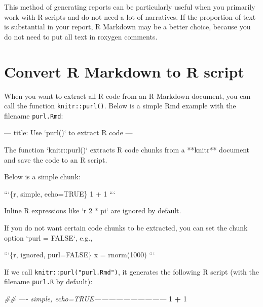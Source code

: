 \documentclass[
  11pt,
]{krantz}
\newenvironment{Shaded}{\begin{snugshade}}{\end{snugshade}}
\newcommand{\BaseNTok}[1]{\textcolor[rgb]{0.06,0.06,0.06}{#1}}
\newcommand{\CommentTok}[1]{\textcolor[rgb]{0.37,0.37,0.37}{\textit{#1}}}
\newcommand{\DecValTok}[1]{\textcolor[rgb]{0.06,0.06,0.06}{#1}}
\newcommand{\NormalTok}[1]{#1}
\newcommand{\OperatorTok}[1]{\textcolor[rgb]{0.43,0.43,0.43}{\textbf{#1}}}
\newcommand{\StringTok}[1]{\textcolor[rgb]{0.5,0.5,0.5}{#1}}
\begin{document}
This method of generating reports can be particularly useful when you primarily work with R scripts and do not need a lot of narratives. If the proportion of text is substantial in your report, R Markdown may be a better choice, because you do not need to put all text in roxygen comments.

\hypertarget{purl}{%
\section{Convert R Markdown to R script}\label{purl}}

When you want to extract all R code from an R Markdown document, you can call the function \texttt{knitr::purl()}. Below is a simple Rmd example with the filename \texttt{purl.Rmd}:

\begin{Shaded}
\begin{Highlighting}[]
\NormalTok{---}
\NormalTok{title: Use }\BaseNTok{`purl()`}\NormalTok{ to extract R code}
\NormalTok{---}

\NormalTok{The function }\BaseNTok{`knitr::purl()`}\NormalTok{ extracts R code chunks from}
\NormalTok{a **knitr** document and save the code to an R script.}

\NormalTok{Below is a simple chunk:}

\BaseNTok{```\{r, simple, echo=TRUE\}}
\BaseNTok{1 + 1}
\BaseNTok{```}

\NormalTok{Inline R expressions like }\BaseNTok{`r 2 * pi`}\NormalTok{ are ignored by default.}

\NormalTok{If you do not want certain code chunks to be extracted,}
\NormalTok{you can set the chunk option }\BaseNTok{`purl = FALSE`}\NormalTok{, e.g.,}

\BaseNTok{```\{r, ignored, purl=FALSE\}}
\BaseNTok{x = rnorm(1000)}
\BaseNTok{```}
\end{Highlighting}
\end{Shaded}

If we call \texttt{knitr::purl("purl.Rmd")}, it generates the following R script (with the filename \texttt{purl.R} by default):

\begin{Shaded}
\begin{Highlighting}[]
\CommentTok{## ---- simple, echo=TRUE------------------------------}
\DecValTok{1} \OperatorTok{+}\StringTok{ }\DecValTok{1}
\end{Highlighting}
\end{Shaded}
\end{document}
